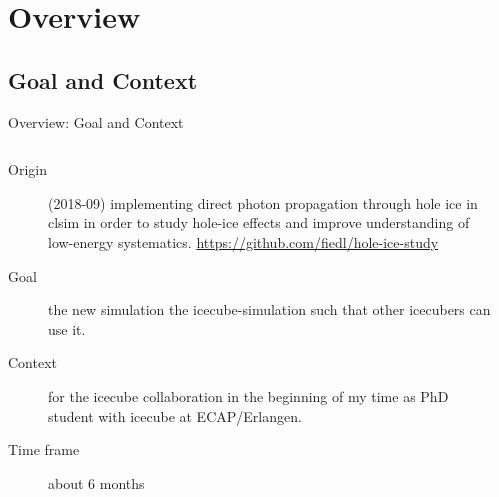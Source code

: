 
\section{Overview}
\subsection{Goal and Context}
\begin{frame}[fragile]{Overview: Goal and Context}
  \begin{columns}
    \begin{column}{0.65\textwidth}
      \begin{description}
        \item[Origin]  (2018-09) implementing direct photon propagation through hole ice in clsim in order to study hole-ice effects and improve understanding of low-energy systematics. \small \url{https://github.com/fiedl/hole-ice-study} \normalsize

        \item[Goal]  the new simulation  the icecube-simulation  such that other icecubers can use it.

        \item[Context]  for the icecube collaboration in the beginning of my time as PhD student with icecube at ECAP/Erlangen.

        \item[Time frame] about 6 months
      \end{description}

    \end{column}
    \begin{column}{0.35\textwidth}

    \end{column}
  \end{columns}
\end{frame}

